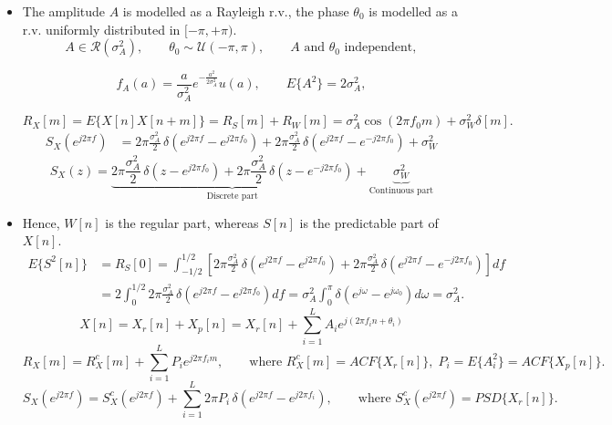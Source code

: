 \begin{itemize}
\item The amplitude \(A\) is modelled as a Rayleigh r.v., the phase \(\theta_0\) is modelled as a r.v. uniformly distributed in \([-\pi,+\pi)\).
\[
A \in \mathcal{R}(\sigma_{A}^{2}), 
\qquad \theta_{0} \sim \mathcal{U}(-\pi,\pi),
\qquad A \text{ and } \theta_{0} \text{ independent},
\]

\[
f_{A}(a) = \frac{a}{\sigma_{A}^{2}} e^{-\frac{a^{2}}{2\sigma_{A}^{2}}} u(a),
\qquad
E\{A^{2}\} = 2\sigma_{A}^{2},
\]

\[
R_{X}[m] = E\{X[n]X[n+m]\}
        = R_{S}[m] + R_{W}[m]
        = \sigma_{A}^{2}\cos(2\pi f_{0} m) + \sigma_{W}^{2}\delta[m].
\]
\begin{align*}
S_X\!\left(e^{j2\pi f}\right)
&= 2\pi \frac{\sigma_{A}^{2}}{2}\,
   \delta\!\left(e^{j2\pi f} - e^{j2\pi f_{0}}\right)
 + 2\pi \frac{\sigma_{A}^{2}}{2}\,
   \delta\!\left(e^{j2\pi f} - e^{-j2\pi f_{0}}\right)
 + \sigma_{W}^{2}
\end{align*}
\[
S_X(z)
= \underbrace{2\pi \frac{\sigma_{A}^{2}}{2}\,
   \delta\!\left(z - e^{j2\pi f_{0}}\right)
 + 2\pi \frac{\sigma_{A}^{2}}{2}\,
   \delta\!\left(z - e^{-j2\pi f_{0}}\right)}_{\text{Discrete part}}
 + \underbrace{\sigma_{W}^{2}}_{\text{Continuous part}}
\]
\item Hence, \(W[n]\) is the regular part, whereas \(S[n]\) is the predictable part of \(X[n]\).
\begin{align*}
E\{S^{2}[n]\}
&= R_{S}[0]
 = \int_{-1/2}^{1/2}
   \left[
      2\pi\frac{\sigma_{A}^{2}}{2}
      \,\delta\!\left(e^{j2\pi f} - e^{j2\pi f_{0}}\right)
    + 2\pi\frac{\sigma_{A}^{2}}{2}
      \,\delta\!\left(e^{j2\pi f} - e^{-j2\pi f_{0}}\right)
   \right] df \\[4pt]
&= 2 \int_{0}^{1/2}
   2\pi\frac{\sigma_{A}^{2}}{2}
   \,\delta\!\left(e^{j2\pi f} - e^{j2\pi f_{0}}\right) df = \sigma_{A}^{2}\int_{0}^{\pi}
   \delta\!\left(e^{j\omega} - e^{j\omega_{0}}\right) d\omega
 = \sigma_{A}^{2}.
\end{align*}
\[
X[n] = X_{r}[n] + X_{p}[n]
     = X_{r}[n] + \sum_{i=1}^{L} A_{i} e^{j(2\pi f_{i} n + \theta_{i})}
\]
\vspace{-1em}
\[
R_{X}[m]
= R_{X}^{c}[m] + \sum_{i=1}^{L} P_{i} e^{j2\pi f_{i} m},
\qquad
\text{where } R_{X}^{c}[m] = ACF\{X_{r}[n]\},\;
P_{i} = E\{A_{i}^{2}\} = ACF\{X_{p}[n]\}.
\]
\vspace{-1em}
\[
S_{X}\!\left(e^{j2\pi f}\right)
= S_{X}^{c}\!\left(e^{j2\pi f}\right)
  + \sum_{i=1}^{L} 2\pi P_{i}\,
    \delta\!\left(e^{j2\pi f} - e^{j2\pi f_{i}}\right),
\qquad
\text{where } S_{X}^{c}(e^{j2\pi f}) = PSD\{X_{r}[n]\}.
\]


\end{itemize}
